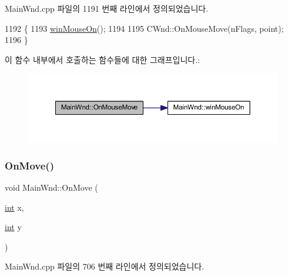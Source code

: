 Main\+Wnd.\+cpp 파일의 1191 번째 라인에서 정의되었습니다.


\begin{DoxyCode}
1192 \{
1193   \mbox{\hyperlink{class_main_wnd_aadc325bab367045adb1258609f8f2c9e}{winMouseOn}}();
1194   
1195   CWnd::OnMouseMove(nFlags, point);
1196 \}
\end{DoxyCode}
이 함수 내부에서 호출하는 함수들에 대한 그래프입니다.\+:
\nopagebreak
\begin{figure}[H]
\begin{center}
\leavevmode
\includegraphics[width=350pt]{class_main_wnd_a487d640fdc35218fbe8fd5d917cb104f_cgraph}
\end{center}
\end{figure}
\mbox{\label{class_main_wnd_ab6523035512af1482f5a9656ea556661}} 
\subsubsection{\texorpdfstring{On\+Move()}{OnMove()}}
{\footnotesize\ttfamily void Main\+Wnd\+::\+On\+Move (\begin{DoxyParamCaption}\item[{\mbox{\hyperlink{_util_8cpp_a0ef32aa8672df19503a49fab2d0c8071}{int}}}]{x,  }\item[{\mbox{\hyperlink{_util_8cpp_a0ef32aa8672df19503a49fab2d0c8071}{int}}}]{y }\end{DoxyParamCaption})\hspace{0.3cm}{\ttfamily [protected]}}



Main\+Wnd.\+cpp 파일의 706 번째 라인에서 정의되었습니다.


